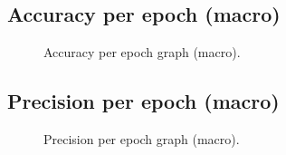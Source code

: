 \documentclass[a4paper,oneside,11pt]{book}
\begin{document}
\subsection{Accuracy per epoch (macro)}
\begin{figure}[H]
    \centering
    \caption{Accuracy per epoch graph (macro).}
\end{figure}
\subsection{Precision per epoch (macro)}
\begin{figure}[H]
    \centering
    \caption{Precision per epoch graph (macro).}
\end{figure}
\end{document}

